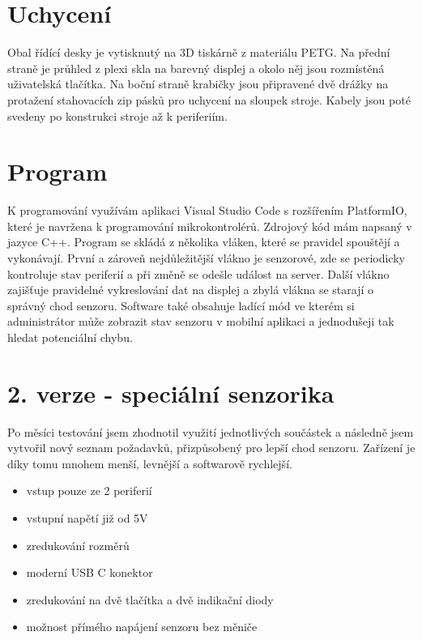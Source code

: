 \section{Uchycení}
Obal řídící desky je vytisknutý na 3D tiskárně z materiálu PETG.
Na přední straně je průhled z plexi skla na barevný displej a okolo něj jsou rozmístěná uživatelská tlačítka.
Na boční straně krabičky jsou připravené dvě drážky na protažení stahovacích zip pásků pro uchycení na sloupek stroje.
Kabely jsou poté svedeny po konstrukci stroje až k periferiím.


\section{Program}
K programování využívám aplikaci Visual Studio Code s rozšířením PlatformIO, které je navržena k programování mikrokontrolérů. 
Zdrojový kód mám napsaný v jazyce C++.
Program se skládá z několika vláken, které se pravidel spouštějí a vykonávají.
První a zároveň nejdůležitější vlákno je senzorové, zde se periodicky kontroluje stav periferií a při změně se odešle událost na server.
Další vlákno zajišťuje pravidelné vykreslování dat na displej a zbylá vlákna se starají o správný chod senzoru.
Software také obsahuje ladící mód ve kterém si administrátor může zobrazit stav senzoru v mobilní aplikaci a jednodušeji tak hledat potenciální chybu. 


\fxnote[author=JA]{\textcolor{mygreen}{Obrázek deksa => krabička}}

\newpage





\section{2. verze - speciální senzorika}

Po měsíci testování jsem zhodnotil využití jednotlivých součástek a následně jsem vytvořil nový seznam požadavků, přizpůsobený pro lepší chod senzoru.
Zařízení je díky tomu mnohem menší, levnější a softwarově rychlejší.

\begin{itemize}
    \item vstup pouze ze 2 periferií
    \item vstupní napětí již od 5V
    \item zredukování rozměrů
    \item moderní USB C konektor
    \item zredukování na dvě tlačítka a dvě indikační diody
    \item možnost přímého napájení senzoru bez měniče
\end{itemize}

